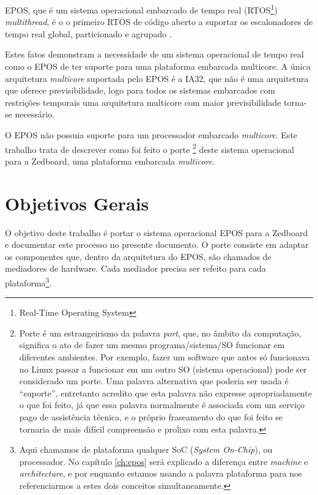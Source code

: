 EPOS, que é um sistema operacional embarcado de tempo real (RTOS\footnote{Real-Time Operating System}) \emph{multithread}, é o o primeiro RTOS de código aberto a suportar os escalonadores de tempo real global, particionado e agrupado \cite{gio}.


Estes fatos demonstram a necessidade de um sistema operacional de tempo real como o EPOS de ter suporte para uma plataforma embarcada multicore. A única arquitetura \emph{multicore} suportada pelo EPOS é a IA32, que não é uma arquitetura que oferece previsibilidade, logo para todos os sistemas embarcados com restrições temporais uma arquitetura multicore com maior previsibilidade torna-se necessário.

O EPOS não possuia suporte para um processador embarcado \emph{multicore}. 
Este trabalho trata de descrever como foi feito o porte
\footnote{Porte é um estrangeirismo da palavra \emph{port}, que, no âmbito da computação, significa o ato de fazer um mesmo programa/sistema/SO funcionar em diferentes ambientes. Por exemplo, fazer um software que antes só funcionava no Linux passar a funcionar em um outro SO (sistema operacional) pode ser considerado um porte. Uma palavra alternativa que poderia ser usada é ``suporte'', entretanto acredito que esta palavra não expresse apropriadamente o que foi feito, já que essa palavra normalmente é associada com um serviço pago de assistência técnica, e o próprio fraseamento do que foi feito se tornaria de mais difícil compreensão e prolixo com esta palavra.}
 deste sistema operacional para a Zedboard, uma plataforma embarcada \emph{multicore}.

\section{Objetivos Gerais}

O objetivo deste trabalho é portar o sistema operacional EPOS para a Zedboard e documentar este processo no presente documento. O porte consiste em adaptar os componentes que, dentro da arquitetura do EPOS, são chamados de mediadores de hardware. Cada mediador precisa ser refeito para cada plataforma\footnote{Aqui chamamos de plataforma qualquer SoC (\emph{System On-Chip}), ou processador. No capítulo \ref{ch:epos} será explicado a diferença entre \emph{machine} e \emph{architecture}, e por enquanto estamos usando a palavra plataforma para nos referenciarmos a estes dois conceitos simultaneamente.}.

